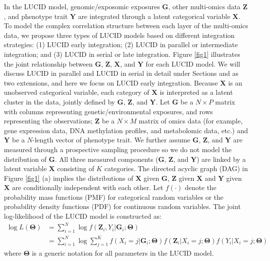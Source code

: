 In the LUCID model, genomic/exposomic exposures $\bm G$, other multi-omics data $\bm Z$, and phenotype trait $\bm Y$ are integrated through a latent categorical variable $\bm X$. To model the complex correlation structure between each layer of the multi-omics data, we propose three types of LUCID models based on different integration strategies: (1) LUCID early integration; (2) LUCID in parallel or intermediate integration; and (3) LUCID in serial or late integration. Figure \ref{fig1} illustrates the joint relationship between $\bm G$, $\bm Z$, $\bm X$, and $\bm Y$ for each LUCID model. We will discuss LUCID in parallel and LUCID in serial in detail under Sections  and  as two extensions, and here we focus on LUCID early integration. Because $\bm X$ is an unobserved categorical variable, each category of $\bm X$ is interpreted as a latent cluster in the data, jointly defined by $\bm G$, $\bm Z$, and $\bm Y$. Let $\bm G$ be a $N \times P$ matrix with columns representing genetic/environmental exposures, and rows representing the observations; $\bm Z$ be a $N \times M$ matrix of omics data (for example, gene expression data, DNA methylation profiles, and metabolomic data, etc.) and $\bm Y$ be a $N$-length vector of phenotype trait. We further assume $\bm G$, $\bm Z$, and $\bm Y$ are measured through a prospective sampling procedure so we do not model the distribution of $\bm G$. All three measured components ($\bm G$, $\bm Z$, and $\bm Y$) are linked by a latent variable $\bm X$ consisting of $K$ categories. The directed acyclic graph (DAG) in Figure \ref{fig1} (a) implies the distributions of $\bm X$ given $\bm G$, $\bm Z$ given $\bm X$ and $\bm Y$ given $\bm X$ are conditionally independent with each other. Let $f(\cdot)$ denote the probability mass functions (PMF) for categorical random variables or the probability density functions (PDF) for continuous random variables. The joint log-likelihood of the LUCID model is constructed as:
\begin{equation}
    \begin{aligned}
         \log L(\bm{\Theta}) & = \sum_{i = 1}^N \log f(\bm{Z}_i, Y_i|\bm{G}_i;\bm{\Theta}) \\
         & = \sum_{i = 1}^N \log \sum_{j = 1}^K f(X_i = j| \bm{G}_i; \bm{\Theta}) f(\bm{Z}_i| X_i = j; \bm{\Theta}) f(Y_i|X_i = j; \bm{\Theta})
    \end{aligned}
    \label{eq1}
\end{equation}
where $\bm \Theta$ is a generic notation for all parameters in the LUCID model.

